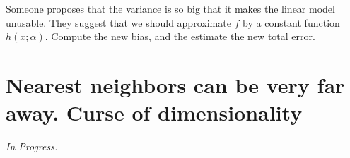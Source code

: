 \documentclass[11pt,oneside]{article}
\theoremstyle{definition}
\theoremstyle{definition}
\theoremstyle{remark}
\numberwithin{equation}{section}
\begin{document}
Someone proposes that the variance is so big that it makes the linear model unusable.  They suggest that we should approximate $f$ by a constant function  $h(x;\alpha)$. Compute the new bias, and the estimate the new total error. 

\newpage


\section{Nearest neighbors can be very far away. Curse of dimensionality}

\textit{In Progress.}
\end{document}
